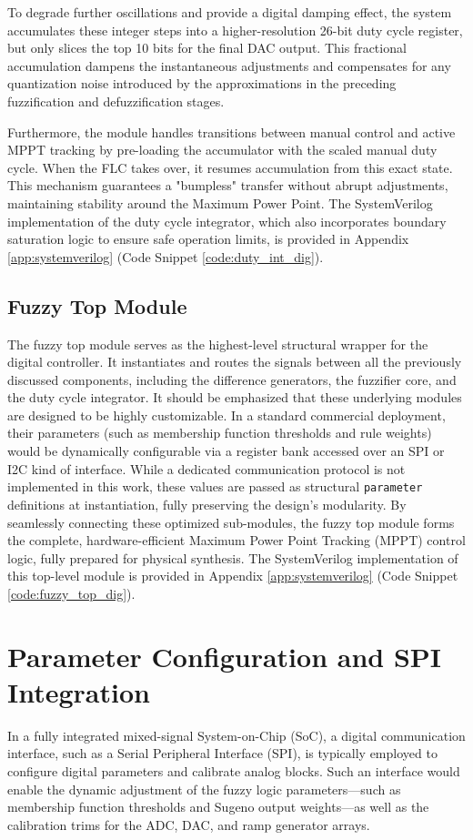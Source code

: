 \documentclass[a4paper,oneside,12pt]{report}
\numberwithin{equation}{chapter}
\begin{document}
To degrade further oscillations and provide a digital damping effect, the system accumulates these integer steps into a higher-resolution 26-bit duty cycle register, but only slices the top 10 bits for the final DAC output. This fractional accumulation dampens the instantaneous adjustments and compensates for any quantization noise introduced by the approximations in the preceding fuzzification and defuzzification stages. 

Furthermore, the module handles transitions between manual control and active MPPT tracking by pre-loading the accumulator with the scaled manual duty cycle. When the FLC takes over, it resumes accumulation from this exact state. This mechanism guarantees a "bumpless" transfer without abrupt adjustments, maintaining stability around the Maximum Power Point. The SystemVerilog implementation of the duty cycle integrator, which also incorporates boundary saturation logic to ensure safe operation limits, is provided in Appendix \ref{app:systemverilog} (Code Snippet \ref{code:duty_int_dig}).

\subsection{Fuzzy Top Module}
The fuzzy top module serves as the highest-level structural wrapper for the digital controller. It instantiates and routes the signals between all the previously discussed components, including the difference generators, the fuzzifier core, and the duty cycle integrator. It should be emphasized that these underlying modules are designed to be highly customizable. In a standard commercial deployment, their parameters (such as membership function thresholds and rule weights) would be dynamically configurable via a register bank accessed over an SPI or I2C kind of interface. While a dedicated communication protocol is not implemented in this work, these values are passed as structural \texttt{parameter} definitions at instantiation, fully preserving the design's modularity. By seamlessly connecting these optimized sub-modules, the fuzzy top module forms the complete, hardware-efficient Maximum Power Point Tracking (MPPT) control logic, fully prepared for physical synthesis. The SystemVerilog implementation of this top-level module is provided in Appendix \ref{app:systemverilog} (Code Snippet \ref{code:fuzzy_top_dig}).

\section{Parameter Configuration and SPI Integration}
In a fully integrated mixed-signal System-on-Chip (SoC), a digital communication interface, such as a Serial Peripheral Interface (SPI), is typically employed to configure digital parameters and calibrate analog blocks. Such an interface would enable the dynamic adjustment of the fuzzy logic parameters—such as membership function thresholds and Sugeno output weights—as well as the calibration trims for the ADC, DAC, and ramp generator arrays.
\end{document}
